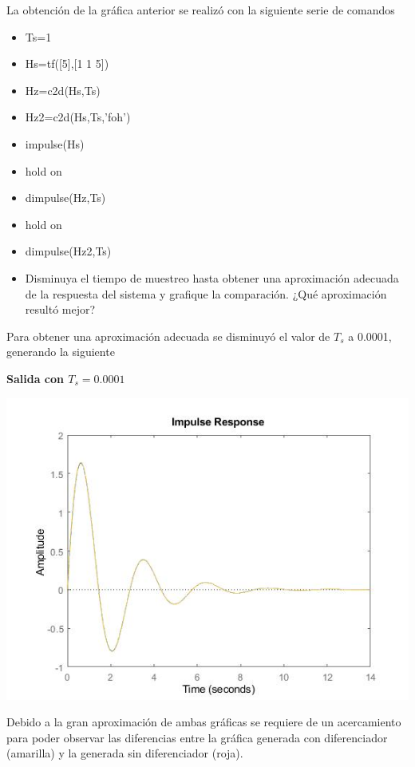 La obtención de la gráfica anterior se realizó con la siguiente serie de comandos

\begin{itemize}
\item Ts=1
\item Hs=tf([5],[1 1 5])
\item Hz=c2d(Hs,Ts)
\item Hz2=c2d(Hs,Ts,'foh')
\item impulse(Hs)
\item hold on
\item dimpulse(Hz,Ts)
\item hold on
\item dimpulse(Hz2,Ts)
\end{itemize}

\begin{itemize}
	\item Disminuya el tiempo de muestreo hasta obtener una aproximación adecuada de la respuesta del sistema
	y grafique la comparación. ¿Qué aproximación resultó mejor?
\end{itemize}

Para obtener una aproximación adecuada se disminuyó el valor de $T_s$ a 0.0001, generando la siguiente 
\newline

\noindent \textbf{Salida con $T_s=0.0001$}

\noindent \includegraphics[scale=0.6]{./img2/SalidaTs00001DosHz}

Debido a la gran aproximación de ambas gráficas se requiere de un acercamiento para poder observar las diferencias entre la gráfica generada con diferenciador (amarilla) y la generada sin diferenciador (roja).

